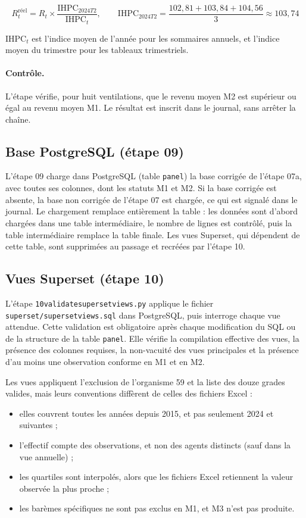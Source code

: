 \documentclass[12pt,a4paper,french]{article}
\renewcommand{\_}{\underscoreorigine\allowbreak}
\begin{document}
\[
R^{\text{réel}}_t = R_t \times \frac{\text{IHPC}_{2024T2}}{\text{IHPC}_t}, \qquad \text{IHPC}_{2024T2} = \frac{102{,}81 + 103{,}84 + 104{,}56}{3} \approx 103{,}74
\]

$\text{IHPC}_t$ est l'indice moyen de l'année pour les sommaires annuels, et l'indice moyen du trimestre pour les tableaux trimestriels.

\paragraph{Contrôle.} L'étape vérifie, pour huit ventilations, que le revenu moyen M2 est supérieur ou égal au revenu moyen M1. Le résultat est inscrit dans le journal, sans arrêter la chaîne.

\subsection{Base PostgreSQL (étape 09)}

L'étape 09 charge dans PostgreSQL (table \texttt{panel}) la base corrigée de l'étape 07a, avec toutes ses colonnes, dont les statuts M1 et M2. Si la base corrigée est absente, la base non corrigée de l'étape 07 est chargée, ce qui est signalé dans le journal. Le chargement remplace entièrement la table : les données sont d'abord chargées dans une table intermédiaire, le nombre de lignes est contrôlé, puis la table intermédiaire remplace la table finale. Les vues Superset, qui dépendent de cette table, sont supprimées au passage et recréées par l'étape 10.

\subsection{Vues Superset (étape 10)}

L'étape \texttt{10\_validate\_superset\_views.py} applique le fichier \texttt{superset/superset\_views.sql} dans PostgreSQL, puis interroge chaque vue attendue. Cette validation est obligatoire après chaque modification du SQL ou de la structure de la table \texttt{panel}. Elle vérifie la compilation effective des vues, la présence des colonnes requises, la non-vacuité des vues principales et la présence d'au moins une observation conforme en M1 et en M2.

Les vues appliquent l'exclusion de l'organisme 59 et la liste des douze grades valides, mais leurs conventions diffèrent de celles des fichiers Excel :

\begin{itemize}
    \item elles couvrent toutes les années depuis 2015, et pas seulement 2024 et suivantes ;
    \item l'effectif compte des observations, et non des agents distincts (sauf dans la vue annuelle) ;
    \item les quartiles sont interpolés, alors que les fichiers Excel retiennent la valeur observée la plus proche ;
    \item les barèmes spécifiques ne sont pas exclus en M1, et M3 n'est pas produite.
\end{itemize}
\end{document}
